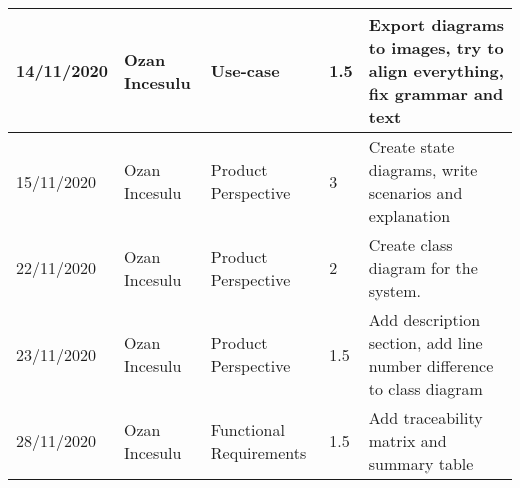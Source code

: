 \begin{table}[h]
\begin{tabular}{|p{2cm}|p{2cm}|p{2cm}|p{1.5cm}|p{8cm}|}
        14/11/2020 & Ozan Incesulu & Use-case          & 1.5              & Export diagrams to images, try to align everything, fix grammar and text \\ \hline
        15/11/2020 & Ozan Incesulu & Product Perspective & 3              & Create state diagrams, write scenarios and explanation \\ \hline
        22/11/2020 & Ozan Incesulu & Product Perspective & 2              & Create class diagram for the system. \\ \hline
        23/11/2020 & Ozan Incesulu & Product Perspective & 1.5            & Add description section, add line number difference to class diagram \\ \hline
        28/11/2020 & Ozan Incesulu & Functional Requirements & 1.5            & Add traceability matrix and summary table\\ \hline
    \end{tabular}
\end{table}
